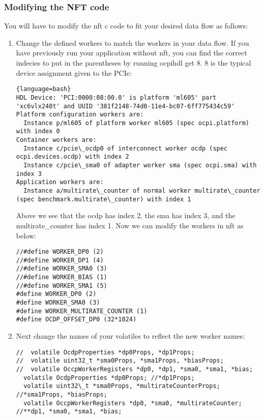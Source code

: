 \subsubsection{Modifying the NFT code}
You will have to modify the nft c code to fit your desired data flow as follows:
\begin{enumerate}

\item Change the defined workers to match the workers in your data flow.  If you have previously run your application without nft, you can find the correct indecies to put in the parentheses by running ocpihdl get 8.  8 is the typical device assignment given to the PCIe:

\begin{lstlisting}{language=bash}
HDL Device: 'PCI:0000:08:00.0' is platform 'ml605' part 'xc6vlx240t' and UUID '381f2148-74d0-11e4-bc07-6ff775434c59'
Platform configuration workers are:
  Instance p/ml605 of platform worker ml605 (spec ocpi.platform) with index 0
Container workers are:
  Instance c/pcie\_ocdp0 of interconnect worker ocdp (spec ocpi.devices.ocdp) with index 2
  Instance c/pcie\_sma0 of adapter worker sma (spec ocpi.sma) with index 3
Application workers are:
  Instance a/multirate\_counter of normal worker multirate\_counter (spec benchmark.multirate\_counter) with index 1
\end{lstlisting}

 Above we see that the ocdp has index 2, the sma has index 3, and the multirate\_counter has index 1.  Now we can modify the workers in nft as below:

\begin{lstlisting}[language=customc]
//#define WORKER_DP0 (2)
//#define WORKER_DP1 (4)
//#define WORKER_SMA0 (3)
//#define WORKER_BIAS (1)
//#define WORKER_SMA1 (5)
#define WORKER_DP0 (2)
#define WORKER_SMA0 (3)
#define WORKER_MULTIRATE_COUNTER (1)
#define OCDP_OFFSET_DP0 (32*1024)
\end{lstlisting}


\item Next change the names of your volatiles to reflect the new worker names:
\begin{lstlisting}[language=customc]
//  volatile OcdpProperties *dp0Props, *dp1Props;
//  volatile uint32_t *sma0Props, *sma1Props, *biasProps;
//  volatile OccpWorkerRegisters *dp0, *dp1, *sma0, *sma1, *bias;
  volatile OcdpProperties *dp0Props; //*dp1Props;
  volatile uint32\_t *sma0Props, *multirateCounterProps; //*sma1Props, *biasProps;
  volatile OccpWorkerRegisters *dp0, *sma0, *multirateCounter; //**dp1, *sma0, *sma1, *bias;


\end{lstlisting}
\end{enumerate}
